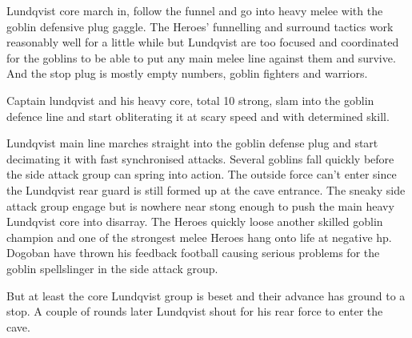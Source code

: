 




Lundqvist core march in, follow the funnel and go into heavy melee with the goblin defensive plug gaggle. The Heroes' funnelling and surround tactics work reasonably well for a little while but Lundqvist are too focused and coordinated for the goblins to be able to put any main melee line against them and survive. And the stop plug is mostly empty numbers, goblin fighters and warriors.

Captain lundqvist and his heavy core, total 10 strong, slam into the goblin defence line and start obliterating it at scary speed and with determined skill.


Lundqvist main line marches straight into the goblin defense plug and start decimating it with fast synchronised attacks. Several goblins fall quickly before the side attack group can spring into action. The outside force can't enter since the Lundqvist rear guard is still formed up at the cave entrance.
The sneaky side attack group engage but is nowhere near stong enough to push the main heavy Lundqvist core into disarray. The Heroes quickly loose another skilled goblin champion and one of the strongest melee Heroes hang onto life at negative hp. Dogoban have thrown his feedback football causing serious problems for the goblin spellslinger in the side attack group.

But at least the core Lundqvist group is beset and their advance has ground to a stop. A couple of rounds later Lundqvist shout for his rear force to enter the cave.




